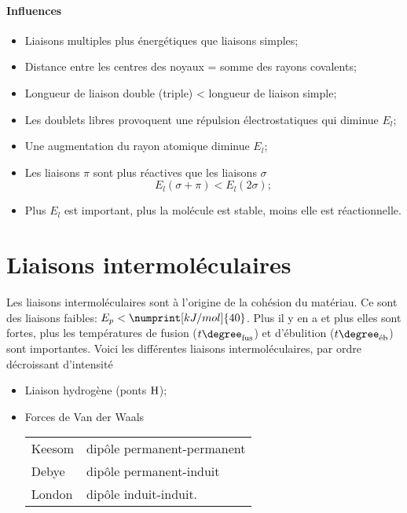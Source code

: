 \paragraph{Influences}
\begin{itemize}
  \item Liaisons multiples plus énergétiques que liaisons simples;
  \item Distance entre les centres des noyaux = somme des rayons covalents;
  \item Longueur de liaison double (triple) < longueur de liaison simple;
  \item Les doublets libres provoquent une répulsion électrostatiques qui diminue $E_l$;
  \item Une augmentation du rayon atomique diminue $E_l$;
  \item Les liaisons $\pi$ sont plus réactives que les liaisons $\sigma$
    \[ E_l(\sigma + \pi) <  E_l(2\sigma) ; \]
  \item Plus $E_l$ est important,
    plus la molécule est stable,
    moins elle est réactionnelle.
\end{itemize}

\section{Liaisons intermoléculaires}
Les liaisons intermoléculaires sont à l'origine de la cohésion du matériau.
Ce sont des liaisons faibles: $E_p<\numprint[kJ/mol]{40}$.
Plus il y en a et plus elles sont fortes,
plus les températures de fusion ($t\degree_{\mathrm{fus}}$) et d'ébulition ($t\degree_{\textrm{éb}}$) sont importantes.
Voici les différentes liaisons intermoléculaires,
par ordre décroissant d'intensité
\begin{itemize}
  \item Liaison hydrogène (ponts $\ce{H}$);
  \item Forces de Van der Waals
    \begin{center}
      \begin{tabular}{ll}
        Keesom & dipôle permanent-permanent\\
        Debye & dipôle permanent-induit\\
        London & dipôle induit-induit.
      \end{tabular}
    \end{center}
\end{itemize}

